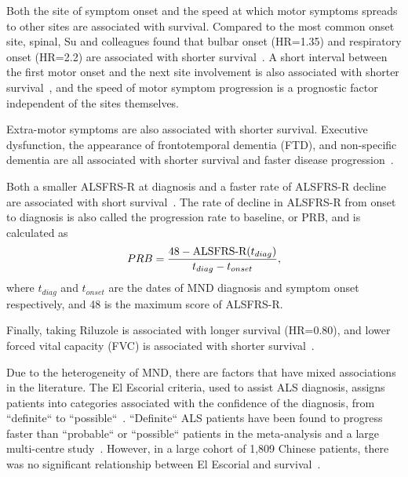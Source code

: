 Both the site of symptom onset and the speed at which motor symptoms spreads to other sites are associated with survival.
Compared to the most common onset site, spinal, Su and colleagues found that bulbar onset (HR=1.35) and respiratory onset (HR=2.2) are associated with shorter survival~\cite{suPredictorsSurvivalPatients2021}.
A short interval between the first motor onset and the next site involvement is also associated with shorter survival~\cite{fujimura-kiyonoOnsetSpreadingPatterns2011a}, and the speed of motor symptom progression is a prognostic factor independent of the sites themselves.

Extra-motor symptoms are also associated with shorter survival.
Executive dysfunction, the appearance of frontotemporal dementia (FTD), and non-specific dementia are all associated with shorter survival and faster disease progression~\cite{suPredictorsSurvivalPatients2021, elaminExecutiveDysfunctionNegative2011}.

Both a smaller ALSFRS-R at diagnosis and a faster rate of ALSFRS-R decline are associated with short survival~\cite{suPredictorsSurvivalPatients2021}.
The rate of decline in ALSFRS-R from onset to diagnosis is also called the progression rate to baseline, or PRB, and is calculated as
\begin{equation}
    PRB = \frac{48-\textnormal{ALSFRS-R}(t_{diag})}{t_{diag}-t_{onset}},
\end{equation}\label{eq:PRB}
where $t_{diag}$ and $t_{onset}$ are the dates of MND diagnosis and symptom onset respectively, and 48 is the maximum score of ALSFRS-R.

Finally, taking Riluzole is associated with longer survival (HR=0.80), and lower forced vital capacity (FVC) is associated with shorter survival~\cite{suPredictorsSurvivalPatients2021}.

Due to the heterogeneity of MND, there are factors that have mixed associations in the literature.
The El Escorial criteria, used to assist ALS diagnosis, assigns patients into categories associated with the confidence of the diagnosis, from ``definite`` to ``possible``~\cite{ludolphRevisionEscorialCriteria2015}.
``Definite`` ALS patients have been found to progress faster than ``probable`` or ``possible`` patients in the meta-analysis and a large multi-centre study~\cite{suPredictorsSurvivalPatients2021, westenengPrognosisPatientsAmyotrophic2018}.
However, in a large cohort of 1,809 Chinese patients, there was no significant relationship between El Escorial and survival~\cite{gaoEpidemiologyFactorsPredicting2021}.

